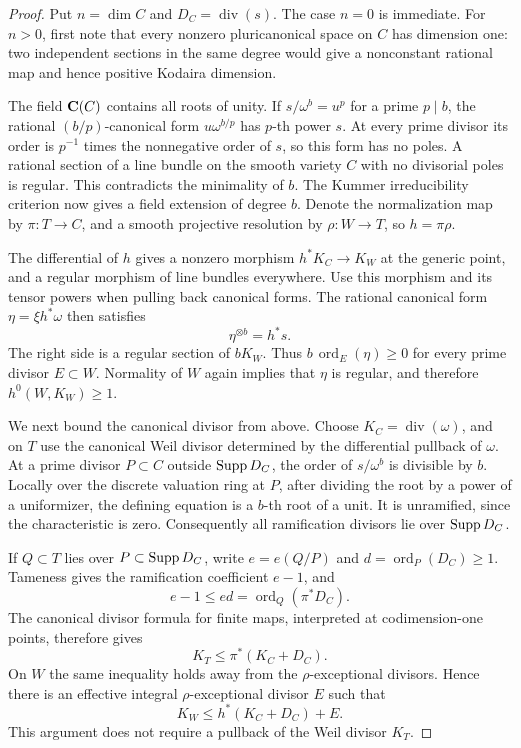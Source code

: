 \begin{proof}
Put \(n=\dim C\) and \(D_C=\operatorname{div}(s)\).
The case \(n=0\) is immediate.  For \(n>0\), first note that every
nonzero pluricanonical space on \(C\) has dimension one:
two independent sections in the same degree would give a nonconstant
rational map and hence positive Kodaira dimension.

The field \(\mathbf C(C)\) contains all roots of unity.
If \(s/\omega^b=u^p\) for a prime \(p\mid b\), the rational
\((b/p)\)-canonical form \(u\omega^{b/p}\) has \(p\)-th power \(s\).
At every prime divisor its order is \(p^{-1}\) times the nonnegative
order of \(s\), so this form has no poles.  A rational section of a
line bundle on the smooth variety \(C\) with no divisorial poles is
regular.  This contradicts the minimality of \(b\).
The Kummer irreducibility criterion now gives a field extension of
degree \(b\).  Denote the normalization map by \(\pi:T\to C\), and a
smooth projective resolution by \(\rho:W\to T\), so \(h=\pi\rho\).

The differential of \(h\) gives a nonzero morphism
\(h^*K_C\to K_W\) at the generic point, and a regular morphism of
line bundles everywhere.  Use this morphism and its tensor powers
when pulling back canonical forms.  The rational canonical form
\(\eta=\xi h^*\omega\) then satisfies
\[
 \eta^{\otimes b}=h^*s.
\]
The right side is a regular section of \(bK_W\).
Thus \(b\,\operatorname{ord}_E(\eta)\geq0\) for every prime divisor
\(E\subset W\).  Normality of \(W\) again implies that \(\eta\) is
regular, and therefore \(h^0(W,K_W)\geq1\).

We next bound the canonical divisor from above.
Choose \(K_C=\operatorname{div}(\omega)\), and on \(T\) use the
canonical Weil divisor determined by the differential pullback of
\(\omega\).  At a prime divisor \(P\subset C\) outside \(\operatorname{Supp} D_C\),
the order of \(s/\omega^b\) is divisible by \(b\).  Locally over the
discrete valuation ring at \(P\), after dividing the root by a
power of a uniformizer, the defining equation is a \(b\)-th root of
a unit.  It is unramified, since the characteristic is zero.
Consequently all ramification divisors lie over \(\operatorname{Supp} D_C\).

If \(Q\subset T\) lies over \(P\subset\operatorname{Supp} D_C\), write
\(e=e(Q/P)\) and \(d=\operatorname{ord}_P(D_C)\geq1\).
Tameness gives the ramification coefficient \(e-1\), and
\[
 e-1\leq ed=\operatorname{ord}_Q(\pi^*D_C).
\]
The canonical divisor formula for finite maps, interpreted at
codimension-one points, therefore gives
\[
 K_T\leq\pi^*(K_C+D_C).
\]
On \(W\) the same inequality holds away from the
\(\rho\)-exceptional divisors.  Hence there is an effective integral
\(\rho\)-exceptional divisor \(E\) such that
\begin{equation}
\label{altord:cb:cover-upper-bound}
 K_W\leq h^*(K_C+D_C)+E.
\end{equation}
This argument does not require a pullback of the Weil divisor \(K_T\).


\end{proof}
